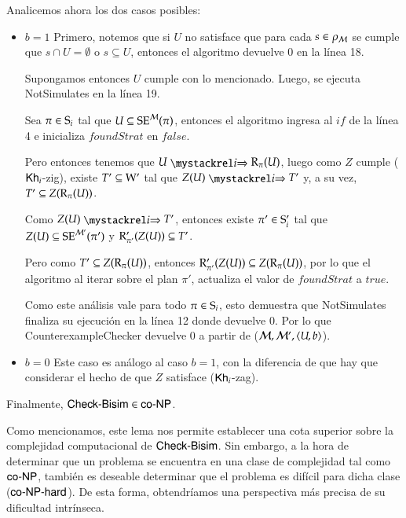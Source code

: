 \begin{demostracion}
\begin{itemize}
        Analicemos ahora los dos casos posibles:

        \begin{itemize}
            \item $b = 1$
                Primero, notemos que si $U$ no satisface que para cada $s \in \rho_\model$ se cumple que $s \cap U = \emptyset$ 
                o $s \subseteq U$, entonces el algoritmo devuelve 0 en la línea 18.

                Supongamos entonces $U$ cumple con lo mencionado. Luego, se ejecuta \textsf{NotSimulates} en la línea 19. 
                
                Sea $\pi \in \S_i$ tal que $U \subseteq \sexec^{\model}(\pi)$, 
                entonces el algoritmo ingresa al $if$ de la línea 4 e inicializa $foundStrat$ en $false$.
                
                Pero entonces tenemos que $U \ultsExecAgi \R_\pi(U)$, luego como $Z$ cumple ($\khi$-zig), existe 
                $T' \subseteq \W'$ tal que $Z(U) \ultsExecAgi T'$ y, a su vez, $T' \subseteq Z(\R_\pi(U))$.
                
                Como $Z(U) \ultsExecAgi T'$, entonces existe $\pi' \in \S_i'$ tal que $Z(U) \subseteq \sexec^{\model'}(\pi')$ y 
                $\R'_{\pi'}(Z(U)) \subseteq T'$.
                
                Pero como $T' \subseteq Z(\R_\pi(U))$, entonces $\R'_{\pi'}(Z(U)) \subseteq Z(\R_\pi(U))$, por lo que 
                el algoritmo al iterar sobre el plan $\pi'$, actualiza el valor de $foundStrat$ a $true$.
                
                Como este análisis vale para todo $\pi \in \S_i$, esto demuestra que \textsf{NotSimulates} finaliza su ejecución en la 
                línea 12 donde devuelve 0. Por lo que \textsf{CounterexampleChecker} devuelve 0 a partir de ($\modults,\modults',\tup{U,b}$).
            \item $b = 0$
                Este caso es análogo al caso $b = 1$, con la diferencia de que hay que considerar el hecho de que 
                $Z$ satisface ($\khi$-zag).
        \end{itemize}

    \end{itemize}
    Finalmente, $\CBisim \in \coNP$.
\end{demostracion}

Como mencionamos, este lema nos permite establecer una cota superior sobre la complejidad computacional de $\CBisim$. 
Sin embargo, a la hora de determinar que un problema se encuentra en una clase de complejidad tal como $\coNP$, también es deseable 
determinar que el problema es difícil para dicha clase ($\coNPHard$). De esta forma, obtendríamos una perspectiva más precisa de su 
dificultad intrínseca.


